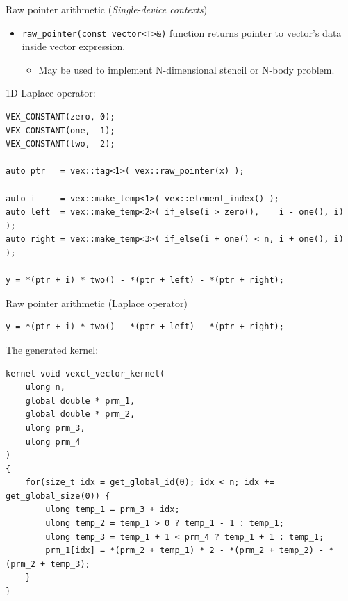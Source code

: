 \documentclass[@BEAMER_OPTIONS@]{beamer}
\newcommand{\code}[1]{\lstinline|#1|}
\newcommand{\singledevice}{\hspace{1cm}\footnotesize(\emph{Single-device contexts})}
\begin{document}
\begin{frame}[fragile]{Raw pointer arithmetic \singledevice}
    \begin{itemize}
        \item \code{raw_pointer(const vector<T>&)} function returns pointer to
            vector's data\\ inside vector expression.
            \begin{itemize}
                \item May be used to implement N-dimensional stencil or
                    N-body problem.
            \end{itemize}
    \end{itemize}
    \begin{exampleblock}{1D Laplace operator:}
        \begin{lstlisting}
VEX_CONSTANT(zero, 0);
VEX_CONSTANT(one,  1);
VEX_CONSTANT(two,  2);

auto ptr   = vex::tag<1>( vex::raw_pointer(x) );

auto i     = vex::make_temp<1>( vex::element_index() );
auto left  = vex::make_temp<2>( if_else(i > zero(),    i - one(), i) );
auto right = vex::make_temp<3>( if_else(i + one() < n, i + one(), i) );

y = *(ptr + i) * two() - *(ptr + left) - *(ptr + right);
        \end{lstlisting}
    \end{exampleblock}
\end{frame}

\note{ }

\begin{frame}[fragile]{Raw pointer arithmetic (Laplace operator)}
    \begin{exampleblock}{}
        \begin{lstlisting}[firstnumber=11]
y = *(ptr + i) * two() - *(ptr + left) - *(ptr + right);
        \end{lstlisting}
    \end{exampleblock}
    \begin{exampleblock}{The generated kernel:}
        \begin{lstlisting}
kernel void vexcl_vector_kernel(
    ulong n,
    global double * prm_1,
    global double * prm_2,
    ulong prm_3,
    ulong prm_4
)
{
    for(size_t idx = get_global_id(0); idx < n; idx += get_global_size(0)) {
        ulong temp_1 = prm_3 + idx;
        ulong temp_2 = temp_1 > 0 ? temp_1 - 1 : temp_1;
        ulong temp_3 = temp_1 + 1 < prm_4 ? temp_1 + 1 : temp_1;
        prm_1[idx] = *(prm_2 + temp_1) * 2 - *(prm_2 + temp_2) - *(prm_2 + temp_3);
    }
}
        \end{lstlisting}
    \end{exampleblock}
\end{frame}
\end{document}
